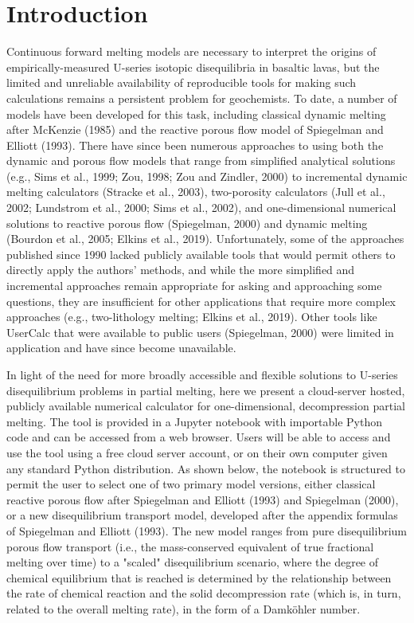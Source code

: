 \documentclass[draft]{agujournal2019}
\begin{document}
\section{Introduction}

Continuous forward melting models are necessary to interpret the origins of empirically-measured U-series isotopic disequilibria in basaltic lavas, but the limited and unreliable availability of reproducible tools for making such calculations remains a persistent problem for geochemists. To date, a number of models have been developed for this task, including classical dynamic melting after McKenzie (1985) and the reactive porous flow model of Spiegelman and Elliott (1993). There have since been numerous approaches to using both the dynamic and porous flow models that range from simplified analytical solutions (e.g., Sims et al., 1999; Zou, 1998; Zou and Zindler, 2000) to incremental dynamic melting calculators (Stracke et al., 2003), two-porosity calculators (Jull et al., 2002; Lundstrom et al., 2000; Sims et al., 2002), and one-dimensional numerical solutions to reactive porous flow (Spiegelman, 2000) and dynamic melting (Bourdon et al., 2005; Elkins et al., 2019). Unfortunately, some of the approaches published since 1990 lacked publicly available tools that would permit others to directly apply the authors’ methods, and while the more simplified and incremental approaches remain appropriate for asking and approaching some questions, they are insufficient for other applications that require more complex approaches (e.g., two-lithology melting; Elkins et al., 2019). Other tools like UserCalc that were available to public users (Spiegelman, 2000) were limited in application and have since become unavailable.

In light of the need for more broadly accessible and flexible solutions to U-series disequilibrium problems in partial melting, here we present a cloud-server hosted, publicly available numerical calculator for one-dimensional, decompression partial melting. The tool is provided in a Jupyter notebook with importable Python code and can be accessed from a web browser. Users will be able to access and use the tool using a free cloud server account, or on their own computer given any standard Python distribution. As shown below, the notebook is structured to permit the user to select one of two primary model versions, either classical reactive porous flow after Spiegelman and Elliott (1993) and Spiegelman (2000), or a new disequilibrium transport model, developed after the appendix formulas of Spiegelman and Elliott (1993). The new model ranges from pure disequilibrium porous flow transport (i.e., the mass-conserved equivalent of true fractional melting over time) to a "scaled" disequilibrium scenario, where the degree of chemical equilibrium that is reached is determined by the relationship between the rate of chemical reaction and the solid decompression rate (which is, in turn, related to the overall melting rate), in the form of a Damköhler number.
\end{document}
